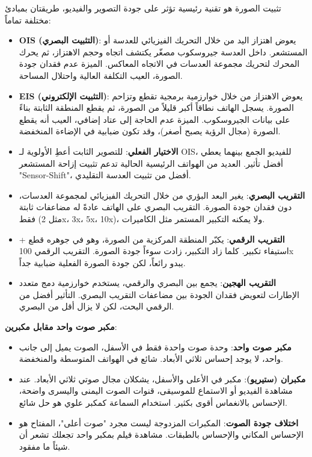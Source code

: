
تثبيت الصورة هو تقنية رئيسية تؤثر على جودة التصوير والفيديو، طريقتان بمبادئ مختلفة تماماً:

\begin{itemize}
  \item \textbf{OIS (التثبيت البصري)}: يعوض اهتزاز اليد من خلال التحريك الفيزيائي للعدسة أو المستشعر. داخل العدسة جيروسكوب مصغّر يكتشف اتجاه وحجم الاهتزاز، ثم يحرك المحرك لتحريك مجموعة العدسات في الاتجاه المعاكس. الميزة عدم فقدان جودة الصورة، العيب التكلفة العالية واحتلال المساحة.
  \item \textbf{EIS (التثبيت الإلكتروني)}: يعوض الاهتزاز من خلال خوارزمية برمجية تقطع وتزاحم الصورة. يسجل الهاتف نطاقاً أكبر قليلاً من الصورة، ثم يقطع المنطقة الثابتة بناءً على بيانات الجيروسكوب. الميزة عدم الحاجة إلى عتاد إضافي، العيب أنه يقطع الصورة (مجال الرؤية يصبح أصغر)، وقد تكون ضبابية في الإضاءة المنخفضة.
  \item \textbf{الاختيار الفعلي}: للتصوير الثابت أعطِ الأولوية لـ OIS، للفيديو الجمع بينهما يعطي أفضل تأثير. العديد من الهواتف الرئيسية الحالية تدعم تثبيت إزاحة المستشعر "Sensor-Shift"، أفضل من تثبيت العدسة التقليدي.
\end{itemize}


\begin{itemize}
  \item \textbf{التقريب البصري}: يغير البعد البؤري من خلال التحريك الفيزيائي لمجموعة العدسات، دون فقدان جودة الصورة. التقريب البصري على الهاتف عادةً له مضاعفات ثابتة فقط (مثل 2x، 3x، 5x، 10x)، ولا يمكنه التكبير المستمر مثل الكاميرات.
  \item \textbf{التقريب الرقمي}: يكبّر المنطقة المركزية من الصورة، وهو في جوهره قطع + استيفاء تكبير. كلما زاد التكبير، زادت سوءاً جودة الصورة. التقريب الرقمي 100x يبدو رائعاً، لكن جودة الصورة الفعلية ضبابية جداً.
  \item \textbf{التقريب الهجين}: يجمع بين البصري والرقمي، يستخدم خوارزمية دمج متعدد الإطارات لتعويض فقدان الجودة بين مضاعفات التقريب البصري. التأثير أفضل من الرقمي البحت، لكن لا يزال أقل من البصري.
\end{itemize}


\textbf{مكبر صوت واحد مقابل مكبرين}:

\begin{itemize}
  \item \textbf{مكبر صوت واحد}: وحدة صوت واحدة فقط في الأسفل، الصوت يميل إلى جانب واحد، لا يوجد إحساس ثلاثي الأبعاد. شائع في الهواتف المتوسطة والمنخفضة.
  \item \textbf{مكبران (ستيريو)}: مكبر في الأعلى والأسفل، يشكلان مجال صوتي ثلاثي الأبعاد. عند مشاهدة الفيديو أو الاستماع للموسيقى، قنوات الصوت اليمنى واليسرى واضحة، الإحساس بالانغماس أقوى بكثير. استخدام السماعة كمكبر علوي هو حل شائع.
  \item \textbf{اختلاف جودة الصوت}: المكبرات المزدوجة ليست مجرد "صوت أعلى"، المفتاح هو الإحساس المكاني والإحساس بالطبقات. مشاهدة فيلم بمكبر واحد تجعلك تشعر أن شيئاً ما مفقود.
\end{itemize}

